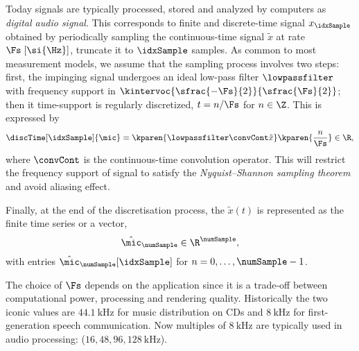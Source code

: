 \mynewline
Today signals are typically processed, stored and analyzed by computers as \textit{digital audio signal}.
This corresponds to finite and discrete-time signal $x_\idxSample$ obtained by periodically sampling the continuous-time signal $\tilde{x}$ at rate $\Fs\;[\si{\Hz}]$, truncate it to $\idxSample$ samples.
As common to most measurement models, we assume that the sampling process involves two steps:
first, the impinging signal undergoes an ideal low-pass filter $\lowpassfilter$ with frequency support in $\kintervoc{\sfrac{-\Fs}{2}}{\sfrac{\Fs}{2}}$; then it time-support is regularly discretized, $t = n/\Fs$ for $n \in \Z$.
This is expressed by
\begin{equation}
    \discTime[\idxSample]{\mic} = \kparen{\lowpassfilter \convCont \tilde{x}}\kparen{\frac{n}{\Fs}} \in \R
    ,
\end{equation}
where $\convCont$ is the continuous-time convolution operator.
This will restrict the frequency support of signal to satisfy the \textit{Nyquist–Shannon sampling theorem} and avoid aliasing effect.

\mynewline
Finally, at the end of the discretisation process, the $\tilde{x}(t)$ is represented as the finite time series or a vector,
\begin{equation}
    \hat{\mic}_{\numSample} \in \R^{\numSample}
    ,
\end{equation}
with entries $\hat{\mic}_{\numSample}[\idxSample]$ for $n = 0, \ldots, \numSample-1$.

\mynewline
The choice of $\Fs$ depends on the application since it is a trade-off between computational power, processing and rendering quality.
Historically the two iconic values are $\SI{44.1}{\kHz}$ for music distribution on CDs and $\SI{8}{\kHz}$ for first-generation speech communication.
Now multiples of $\SI{8}{\kHz}$ are typically used in audio processing: ($16, 48, 96, \SI{128}{\kHz}$).

